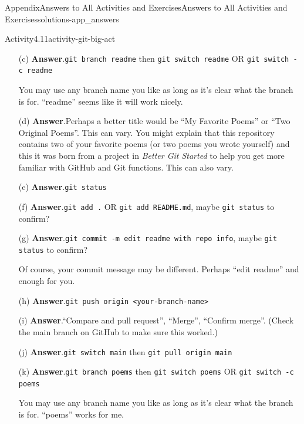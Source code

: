 \documentclass[oneside,10pt,]{book}
\newcommand{\blocktitlefont}{\relax}
\newcommand{\mono}[1]{\texttt{#1}}
\newcommand{\pubtitle}[1]{\textsl{#1}}
\begin{document}
\begin{solutions-chapter}{Appendix}{Answers to All Activities and Exercises}{}{Answers to All Activities and Exercises}{}{}{solutions-app_answers}
\begin{activitysolution}{Activity}{4.11}{}{activity-git-big-act}
\begin{enumerate}[font=\bfseries,label=(\alph*),ref=\alph*]
\item[(c)]\noindent\textbf{\blocktitlefont Answer}.\hypertarget{answer-git-big-act-d-b-back}{}\quad{}\mono{git branch readme} then \mono{git switch readme} OR \mono{git switch -c readme}%
\par
You may use any branch name you like as long as it's clear what the branch is for. ``readme'' seems like it will work nicely.%
\item[(d)]\noindent\textbf{\blocktitlefont Answer}.\hypertarget{answer-git-big-act-e-b-back}{}\quad{}Perhaps a better title would be ``My Favorite Poems'' or ``Two Original Poems''. This can vary. You might explain that this repository contains two of your favorite poems (or two poems you wrote yourself) and this it was born from a project in \pubtitle{Better Git Started} to help you get more familiar with GitHub and Git functions. This can also vary.%
\item[(e)]\noindent\textbf{\blocktitlefont Answer}.\hypertarget{answer-git-big-act-f-b-back}{}\quad{}\mono{git status}%
\item[(f)]\noindent\textbf{\blocktitlefont Answer}.\hypertarget{answer-git-big-act-g-b-back}{}\quad{}\mono{git add .} OR \mono{git add README.md}, maybe \mono{git status} to confirm?%
\item[(g)]\noindent\textbf{\blocktitlefont Answer}.\hypertarget{answer-git-big-act-h-b-back}{}\quad{}\mono{git commit -m \textquotesingle{}edit readme with repo info\textquotesingle{}}, maybe \mono{git status} to confirm?%
\par
Of course, your commit message may be different. Perhaps ``edit readme'' and enough for you.%
\item[(h)]\noindent\textbf{\blocktitlefont Answer}.\hypertarget{answer-git-big-act-i-b-back}{}\quad{}\mono{git push origin <your-branch-name>}%
\item[(i)]\noindent\textbf{\blocktitlefont Answer}.\hypertarget{answer-git-big-act-j-b-back}{}\quad{}``Compare and pull request'', ``Merge'', ``Confirm merge''. (Check the main branch on GitHub to make sure this worked.)%
\item[(j)]\noindent\textbf{\blocktitlefont Answer}.\hypertarget{answer-git-big-act-k-b-back}{}\quad{}\mono{git switch main} then \mono{git pull origin main}%
\item[(k)]\noindent\textbf{\blocktitlefont Answer}.\hypertarget{answer-git-big-act-l-b-back}{}\quad{}\mono{git branch poems} then \mono{git switch poems} OR \mono{git switch -c poems}%
\par
You may use any branch name you like as long as it's clear what the branch is for. ``poems'' works for me.%

\end{enumerate}
\end{activitysolution}
\end{solutions-chapter}
\end{document}
